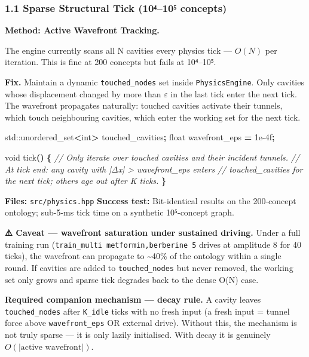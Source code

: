 \documentclass[
  11pt,
  a4paper,
]{article}
\newenvironment{Shaded}{\begin{snugshade}}{\end{snugshade}}
\newcommand{\BuiltInTok}[1]{#1}
\newcommand{\CommentTok}[1]{\textcolor[rgb]{0.56,0.35,0.01}{\textit{#1}}}
\newcommand{\DataTypeTok}[1]{\textcolor[rgb]{0.13,0.29,0.53}{#1}}
\newcommand{\FloatTok}[1]{\textcolor[rgb]{0.00,0.00,0.81}{#1}}
\newcommand{\NormalTok}[1]{#1}
\newcommand{\OperatorTok}[1]{\textcolor[rgb]{0.81,0.36,0.00}{\textbf{#1}}}
\begin{document}
\subsubsection{1.1 Sparse Structural Tick (10⁴--10⁵
concepts)}\label{sparse-structural-tick-10ux207410ux2075-concepts}

\textbf{Method: Active Wavefront Tracking.}

The engine currently scans all N cavities every physics tick ---
\(O(N)\) per iteration. This is fine at 200 concepts but fails at
10⁴--10⁵.

\textbf{Fix.} Maintain a dynamic \texttt{touched\_nodes} set inside
\texttt{PhysicsEngine}. Only cavities whose displacement changed by more
than \(\varepsilon\) in the last tick enter the next tick. The wavefront
propagates naturally: touched cavities activate their tunnels, which
touch neighbouring cavities, which enter the working set for the next
tick.

\begin{Shaded}
\begin{Highlighting}[]
\BuiltInTok{std::}\NormalTok{unordered\_set}\OperatorTok{\textless{}}\DataTypeTok{int}\OperatorTok{\textgreater{}}\NormalTok{ touched\_cavities}\OperatorTok{;}
\DataTypeTok{float}\NormalTok{ wavefront\_eps }\OperatorTok{=} \FloatTok{1e{-}4}\BuiltInTok{f}\OperatorTok{;}

\DataTypeTok{void}\NormalTok{ tick}\OperatorTok{()} \OperatorTok{\{}
    \CommentTok{// Only iterate over touched cavities and their incident tunnels.}
    \CommentTok{// At tick end: any cavity with |Δx| \textgreater{} wavefront\_eps enters}
    \CommentTok{// touched\_cavities for the next tick; others age out after K ticks.}
\OperatorTok{\}}
\end{Highlighting}
\end{Shaded}

\textbf{Files:} \texttt{src/physics.hpp} \textbf{Success test:}
Bit-identical results on the 200-concept ontology; sub-5-ms tick time on
a synthetic 10⁵-concept graph.

\textbf{⚠️ Caveat --- wavefront saturation under sustained driving.}
Under a full training run (\texttt{train\_multi\ metformin,berberine\ 5}
drives at amplitude 8 for 40 ticks), the wavefront can propagate to
\textasciitilde40\% of the ontology within a single round. If cavities
are added to \texttt{touched\_nodes} but never removed, the working set
only grows and sparse tick degrades back to the dense O(N) case.

\textbf{Required companion mechanism --- decay rule.} A cavity leaves
\texttt{touched\_nodes} after \texttt{K\_idle} ticks with no fresh input
(a fresh input = tunnel force above \texttt{wavefront\_eps} OR external
drive). Without this, the mechanism is not truly sparse --- it is only
lazily initialised. With decay it is genuinely
\(O(|\text{active wavefront}|)\).
\end{document}

